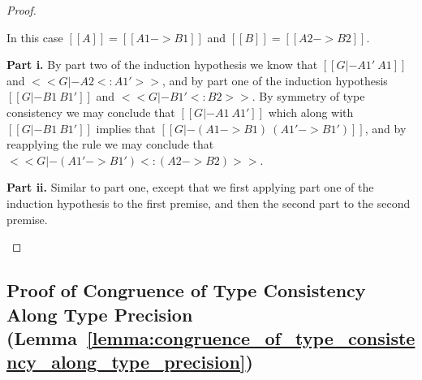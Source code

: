 \begin{proof}
\begin{itemize}
  In this case $[[A]] = [[A1 -> B1]]$ and $[[B]] = [[A2 -> B2]]$.

  \noindent
  \textbf{Part i.} By part two of the induction hypothesis we know
  that $[[G |- A1' ~ A1]]$ and $<<G |- A2 <: A1'>>$, and by part one of the induction hypothesis
  $[[G |- B1 ~ B1']]$ and $<<G |- B1' <: B2>>$.  By symmetry of type consistency
  we may conclude that $[[G |- A1 ~ A1']]$ which along with $[[G |- B1 ~ B1']]$
  implies that $[[G |- (A1 -> B1) ~ (A1' -> B1')]]$, and by reapplying the rule
  we may conclude that $<<G |- (A1' -> B1') <: (A2 -> B2)>>$.

  \noindent
  \textbf{Part ii.} Similar to part one, except that we first
  applying part one of the induction hypothesis to the first
  premise, and then the second part to the second premise.
  
\end{itemize}
\end{proof}

\subsection{Proof of Congruence of Type Consistency Along Type Precision (Lemma~\ref{lemma:congruence_of_type_consistency_along_type_precision})}
\label{subsec:proof_of_congruence_of_type_consistency_along_type_precision_lemma:congruence_of_type_consistency_along_type_precision}

